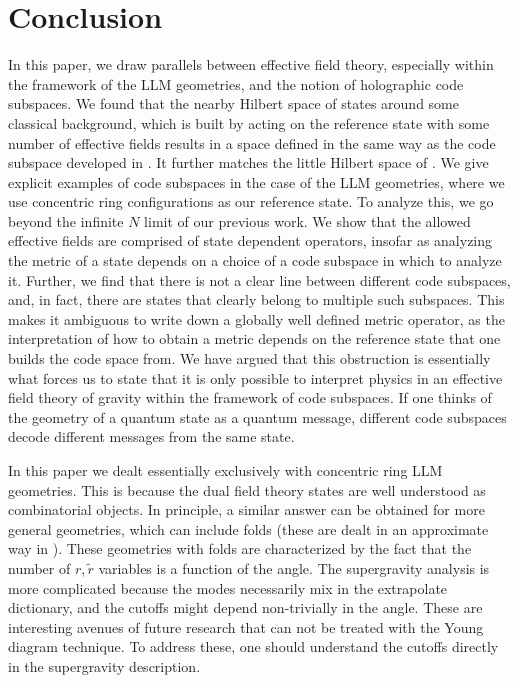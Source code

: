 \documentclass[12pt,nofootinbib, longbibliography]{revtex4-1}
\begin{document}
\section{Conclusion}

In this paper, we draw parallels between effective field theory, especially within the framework of the LLM geometries, and the notion of holographic code subspaces. We found that the nearby Hilbert space of states around some classical background, which is built by acting on the reference state with some number of effective fields results in a space defined in the same way as the code subspace developed in \cite{Almheiri:2014lwa}. It further matches the little Hilbert space of \cite{Papadodimas:2015jra}. We give explicit examples of code subspaces in the case of the LLM geometries, where we use concentric ring configurations as our reference state. To analyze this, we go beyond the infinite $N$ limit of our previous work. We show that the allowed effective fields are comprised of state dependent operators, insofar as analyzing the metric of a state depends on a choice of a code subspace in which to analyze it. 
 Further, we find that there is not a clear line between different code subspaces, and, in fact, there are states that clearly belong to multiple such  subspaces. This makes it ambiguous to write down a globally well defined metric operator, as the interpretation of how to obtain a metric   depends on the reference state that one builds the code space from. We have argued that this obstruction is essentially what forces us to state that it is only possible to interpret physics in an effective field theory of gravity within the framework of  code subspaces.
 If one thinks of the geometry of a quantum state as a quantum message, different code subspaces decode different messages from the same state. 

In this paper we dealt essentially exclusively with concentric ring LLM geometries. This is because the dual field theory states are well understood  as  combinatorial objects. In principle, a similar answer can be obtained for more general geometries, which can include folds (these are dealt in an approximate way in \cite{Berenstein:2017abm}). These  geometries with folds are characterized by the fact that the number of $r,\tilde r $ variables is a function of the angle. The supergravity analysis is more complicated because the modes necessarily mix in the extrapolate dictionary, and the cutoffs might depend non-trivially in the angle. These are interesting avenues of future research that can not be treated with the Young diagram technique. To address these, one should understand the cutoffs directly in the supergravity description.  
\end{document}
